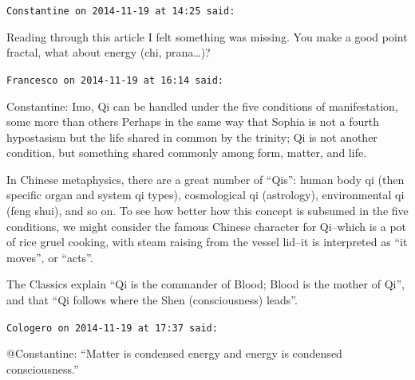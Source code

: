 \begin{footnotesize}\begin{sffamily}



\texttt{Constantine on 2014-11-19 at 14:25 said: }

Reading through this article I felt something was missing. You make a good point fractal, what about energy (chi, prana…)?


\hfill

\texttt{Francesco on 2014-11-19 at 16:14 said: }

Constantine: Imo, Qi can be handled under the five conditions of manifestation, some more than others Perhaps in the same way that Sophia is not a fourth hypostasism but the life shared in common by the trinity; Qi is not another condition, but something shared commonly among form, matter, and life. 

In Chinese metaphysics, there are a great number of “Qis”: human body qi (then specific organ and system qi types), cosmological qi (astrology), environmental qi (feng shui), and so on. To see how better how this concept is subsumed in the five conditions, we might consider the famous Chinese character for Qi–which is a pot of rice gruel cooking, with steam raising from the vessel lid–it is interpreted as “it moves”, or “acts”.

The Classics explain “Qi is the commander of Blood; Blood is the mother of Qi”, and that “Qi follows where the Shen (consciousness) leads”.


\hfill

\texttt{Cologero on 2014-11-19 at 17:37 said: }

@Constantine: “Matter is condensed energy and energy is condensed consciousness.” 


\end{sffamily}\end{footnotesize}
